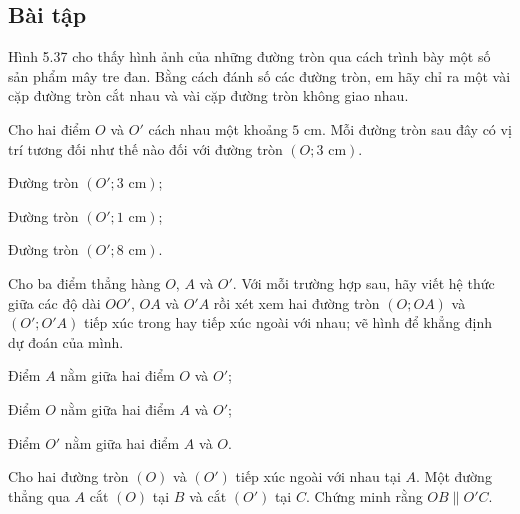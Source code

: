 \begin{exercises}
    \subsection{Bài tập}

    \begin{questions}[resume=SGK]
        \item Hình 5.37 cho thấy hình ảnh của những đường tròn qua cách trình bày một số sản phẩm mây tre đan. Bằng cách đánh số các đường tròn, em hãy chỉ ra một vài cặp đường tròn cắt nhau và vài cặp đường tròn không giao nhau.


        \answerline
        \answerline

        \item Cho hai điểm $O$ và $O'$ cách nhau một khoảng $5$ cm. Mỗi đường tròn sau đây có vị trí tương đối như thế nào đối với đường tròn $(O;3\text{ cm})$.
        \begin{questions}
            \item Đường tròn $(O';3\text{ cm})$;

            \answerline
            \item Đường tròn $(O';1\text{ cm})$;

            \answerline
            \item Đường tròn $(O';8\text{ cm})$.

            \answerline
        \end{questions}

        \item Cho ba điểm thẳng hàng $O$, $A$ và $O'$. Với mỗi trường hợp sau, hãy viết hệ thức giữa các độ dài $OO'$, $OA$ và $O'A$ rồi xét xem hai đường tròn $(O;OA)$ và $(O';O'A)$ tiếp xúc trong hay tiếp xúc ngoài với nhau; vẽ hình để khẳng định dự đoán của mình.
        \begin{questions}
            \item Điểm $A$ nằm giữa hai điểm $O$ và $O'$;

            \answerline
            \answerline
            \item Điểm $O$ nằm giữa hai điểm $A$ và $O'$;

            \answerline
            \answerline
            \item Điểm $O'$ nằm giữa hai điểm $A$ và $O$.

            \answerline
            \answerline
        \end{questions}

        \item Cho hai đường tròn $(O)$ và $(O')$ tiếp xúc ngoài với nhau tại $A$. Một đường thẳng qua $A$ cắt $(O)$ tại $B$ và cắt $(O')$ tại $C$. Chứng minh rằng $OB\parallel O'C$.

        \answerline
        \answerline
        \answerline
    \end{questions}
\end{exercises}

